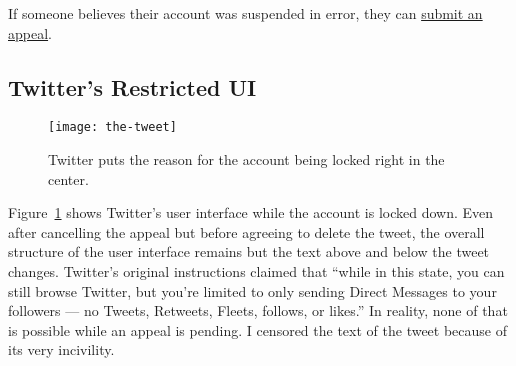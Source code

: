 If someone believes their account was suspended in error, they can
\href{https://web.archive.org/web/20220905021323/https://help.twitter.com/forms/general?subtopic=suspended}{submit
an appeal}.


\subsection{Twitter's Restricted UI}
\label{sec:twitter:thetweet}

\begin{figure}
\centering
\texttt{[image: the-tweet]}
\caption{Twitter puts the reason for the account being locked right in the center.}
\label{fig:thetweet}
\end{figure}

Figure~\ref{fig:thetweet} shows Twitter's user interface while the account is
locked down. Even after cancelling the appeal but before agreeing to delete the
tweet, the overall structure of the user interface remains but the text above
and below the tweet changes. Twitter's original instructions claimed that
``while in this state, you can still browse Twitter, but you're limited to only
sending Direct Messages to your followers --- no Tweets, Retweets, Fleets,
follows, or likes.'' In reality, none of that is possible while an appeal is
pending. I censored the text of the tweet because of its very incivility.
